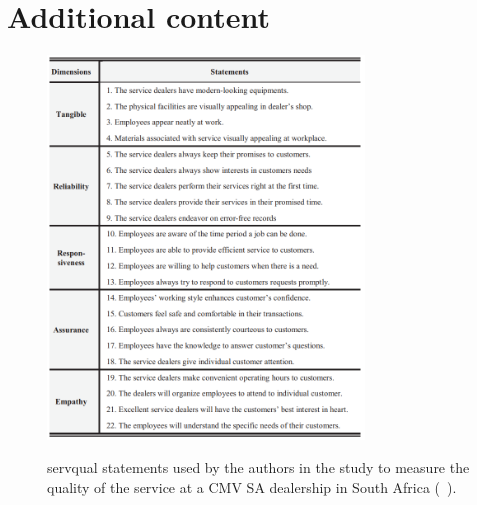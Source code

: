\chapter{Additional content}


\begin{figure}[h]
    \caption{\ac{servqual} statements used by the authors in the study to measure the quality of the service at a CMV SA dealership in South Africa (~\cite{Measuring_After_sales_Service_Quality}).}
    \centering
    \includegraphics[width=0.75\textwidth]{figs/SERVQUAL_statements}
    \label{fig:SERVQUAL_statements}
  \end{figure}



